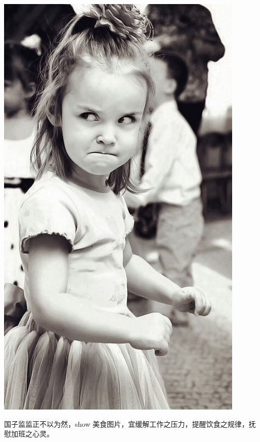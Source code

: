 \documentclass[12pt, a4paper]{book}
\begin{document}
\begin{CJK}{UTF8}{gbsn}
    \begin{center}
        \includegraphics[height=0.3\textheight]{./figure/desktop-0.jpg}
    \end{center}

    国子监监正不以为然，show 美食图片，宜缓解工作之压力，提醒饮食之规律，抚慰加班之心灵。


\end{CJK}
\end{document}
